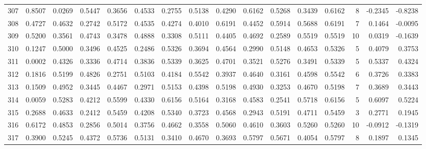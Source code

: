 \begin{tabular}{lrrrrrrrrrrrrrrr}
307 &      0.8507 &  0.0269 &  0.5447 &  0.3656 &  0.4533 &  0.2755 &  0.5138 &  0.4290 &  0.6162 &  0.5268 &   0.3439 &     0.6162 &      8 &                   -0.2345 &                    -0.8238 \\
308 &      0.4727 &  0.4632 &  0.2742 &  0.5172 &  0.4535 &  0.4274 &  0.4010 &  0.6191 &  0.4452 &  0.5914 &   0.5688 &     0.6191 &      7 &                    0.1464 &                    -0.0095 \\
309 &      0.5200 &  0.3561 &  0.4743 &  0.3478 &  0.4888 &  0.3308 &  0.5111 &  0.4405 &  0.4692 &  0.2589 &   0.5519 &     0.5519 &     10 &                    0.0319 &                    -0.1639 \\
310 &      0.1247 &  0.5000 &  0.3496 &  0.4525 &  0.2486 &  0.5326 &  0.3694 &  0.4564 &  0.2990 &  0.5148 &   0.4653 &     0.5326 &      5 &                    0.4079 &                     0.3753 \\
311 &      0.0002 &  0.4326 &  0.3336 &  0.4714 &  0.3836 &  0.5339 &  0.3625 &  0.4701 &  0.3521 &  0.5276 &   0.3491 &     0.5339 &      5 &                    0.5337 &                     0.4324 \\
312 &      0.1816 &  0.5199 &  0.4826 &  0.2751 &  0.5103 &  0.4184 &  0.5542 &  0.3937 &  0.4640 &  0.3161 &   0.4598 &     0.5542 &      6 &                    0.3726 &                     0.3383 \\
313 &      0.1509 &  0.4952 &  0.3445 &  0.4467 &  0.2971 &  0.5153 &  0.4398 &  0.5198 &  0.4930 &  0.3253 &   0.4670 &     0.5198 &      7 &                    0.3689 &                     0.3443 \\
314 &      0.0059 &  0.5283 &  0.4212 &  0.5599 &  0.4330 &  0.6156 &  0.5164 &  0.3168 &  0.4583 &  0.2541 &   0.5718 &     0.6156 &      5 &                    0.6097 &                     0.5224 \\
315 &      0.2688 &  0.4633 &  0.2412 &  0.5459 &  0.4208 &  0.5340 &  0.3723 &  0.4568 &  0.2943 &  0.5191 &   0.4711 &     0.5459 &      3 &                    0.2771 &                     0.1945 \\
316 &      0.6172 &  0.4853 &  0.2856 &  0.5014 &  0.3756 &  0.4662 &  0.3558 &  0.5060 &  0.4610 &  0.3603 &   0.5260 &     0.5260 &     10 &                   -0.0912 &                    -0.1319 \\
317 &      0.3900 &  0.5245 &  0.4372 &  0.5736 &  0.5131 &  0.3410 &  0.4670 &  0.3693 &  0.5797 &  0.5671 &   0.4054 &     0.5797 &      8 &                    0.1897 &                     0.1345 \\

\end{tabular}
